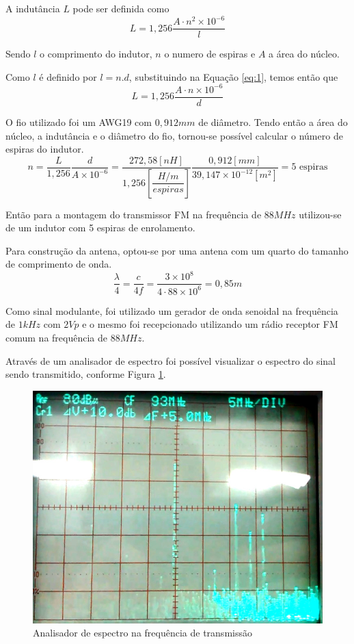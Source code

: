 \documentclass[12pt,a4paper]{article}%
\begin{document}
A indutância $L$ pode ser definida como
\begin{equation}
L=1,256\frac{A\cdot n^2 \times10^{-6}}{l}
\label{eq:1}
\end{equation}

Sendo $l$ o comprimento do indutor, $n$ o numero de espiras e $A$ a área do núcleo.

Como $l$ é definido por $l=n.d$, substituindo na Equação \ref{eq:1}, temos então que
\begin{equation}
L=1,256\frac{A\cdot n\times10^{-6}}{d}
\end{equation}

O fio utilizado foi um AWG19 com $0,912mm$ de diâmetro. Tendo então a área do núcleo, a indutância e o diâmetro do fio, tornou-se possível calcular o número de espiras do indutor.
\begin{equation}
n=\frac{L}{1,256}\frac{d}{A\times10^{-6}}=\frac{272,58[nH]}{1,256[\dfrac{H/m}{espiras}]}\frac{0,912[mm]}{39,147\times10^{-12}[m^2]}=5 \text{ espiras}
\end{equation}

Então para a montagem do transmissor FM na frequência de $88MHz$ utilizou-se de um indutor com 5 espiras de enrolamento.

Para construção da antena, optou-se por uma antena com um quarto do tamanho de comprimento de onda.
\begin{equation}
\frac{\lambda}{4}=\frac{c}{4f}=\frac{3\times10^8}{4\cdot 88\times10^6}=0,85m
\end{equation}

Como sinal modulante, foi utilizado um gerador de onda senoidal na frequência de $1kHz$ com $2Vp$ e o mesmo foi recepcionado utilizando um rádio receptor FM comum na frequência de $88MHz$.

Através de um analisador de espectro foi possível visualizar o espectro do sinal sendo transmitido, conforme Figura \ref{fig:analisador}.

\begin{figure}[H]
\centering
\includegraphics[scale=0.6]{imagem/analisador.jpg}
\caption{Analisador de espectro na frequência de transmissão}
\label{fig:analisador}
\end{figure}
\end{document}
